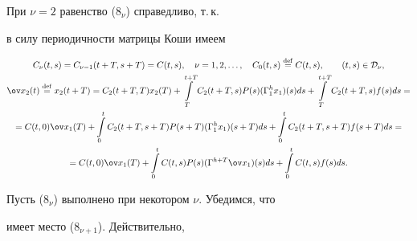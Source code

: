 При $\nu =2$ равенство ($8_\nu$) справедливо, т.\,к.


в силу периодичности матрицы Коши имеем


\begin{gather*}


C_{\nu}(t,s)=C_{\nu -1}(t+T,s+T)=C(t,s), \quad \nu


=1,2,\dotsc,\quad C_0(t,s)\eqdef C(t,s), \qquad


(t,s)\in {\cal D_{\nu}},\\


%


{\ov x_2}(t)\eqdef x_2(t+T)=


C_2(t+T,T)x_2(T)+\int\limits_T^{t+T}C_2(t+T,s)P(s)({\Gamma}_1^hx_1)(s)ds+


\int\limits_T^{t+T}C_2(t+T,s)f(s)ds= \\


%


=C(t,0){\ov x_1}(T)+


\int\limits_0^tC_2(t+T,s+T)P(s+T)({\Gamma}_1^hx_1)(s+T)ds+


\int\limits_0^tC_2(t+T,s+T)f(s+T)ds= \\


%


=C(t,0){\ov x_1}(T)+


\int\limits_0^tC(t,s)P(s)({\Gamma}^{h+T}{\ov x_1})(s)ds+


\int\limits_0^tC(t,s)f(s)ds.


\end{gather*}


Пусть ($8_\nu$) выполнено при некотором ${\nu}$. Убедимся, что


имеет место ($8_{\nu+1}$). Действительно,


